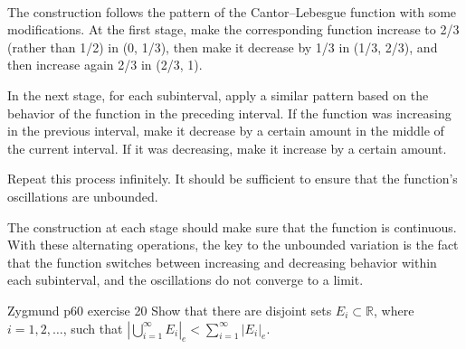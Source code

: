 \documentclass[UTF8,a4paper,10pt]{article}
\begin{document}
\begin{solution}\,


  The construction follows the pattern of the  Cantor–Lebesgue function with some modifications. At the first stage, make the corresponding function increase to 2/3 (rather than 1/2) in (0, 1/3), then make it decrease by 1/3 in (1/3, 2/3), and then increase again 2/3 in (2/3, 1). 
  
  In the next stage, for each subinterval, apply a similar pattern based on the behavior of the function in the preceding interval. If the function was increasing in the previous interval, make it decrease by a certain amount in the middle of the current interval. If it was decreasing, make it increase by a certain amount. 
  
  
  Repeat this process infinitely.
  It should be sufficient to ensure that the function's oscillations are unbounded.

  The construction at each stage should make sure that the function is continuous.
  With these alternating operations, the key to the unbounded variation is the fact that the function switches between increasing and decreasing behavior within each subinterval, and the oscillations do not converge to a limit.

\end{solution}


\begin{Problem}[]{Zygmund p60 exercise 20}
  Show that there are disjoint sets $E_i \subset \mathbb{R}$, where $i = 1, 2, \ldots$, such that $\left|\bigcup_{i=1}^{\infty} E_i\right|_e < \sum_{i=1}^{\infty}|E_i|_e.$ 

\end{Problem}
\end{document}
